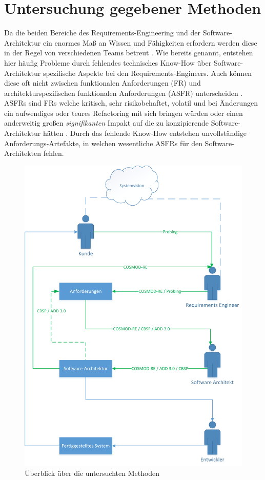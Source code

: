 \section{Untersuchung gegebener Methoden}\label{unters}
Da die beiden Bereiche des Requirements-Engineering und der Software-Architektur ein enormes Ma\ss{} an Wissen und F\"ahigkeiten erfordern werden diese in der Regel von verschiedenen Teams betreut \cite{Ros02}. Wie bereits genannt, entstehen hier h\"aufig Probleme durch fehlendes technisches Know-How \"uber Software-Architektur spezifische Aspekte bei den Requirements-Engineers. Auch k\"onnen diese oft nicht zwischen funktionalen Anforderungen (FR) und architekturspezifischen funktionalen Anforderungen (ASFR) unterscheiden \cite{Ros03}. ASFRs sind FRs welche kritisch, sehr risikobehaftet, volatil und bei \"Anderungen ein aufwendiges oder teures Refactoring mit sich bringen w\"urden oder einen anderweitig gro\ss{}en \textit{signifikanten} Impakt auf die zu konzipierende Software-Architektur h\"atten \cite{Ros02}. Durch das fehlende Know-How entstehen unvollst\"andige Anforderungs-Artefakte, in welchen wesentliche ASFRs f\"ur den Software-Architekten fehlen. \\

\begin{figure}[h]
	\centering
	\includegraphics[scale=0.5]{methoden.png} 
	\caption{\"Uberblick \"uber die untersuchten Methoden}\label{methoden}
\end{figure}

